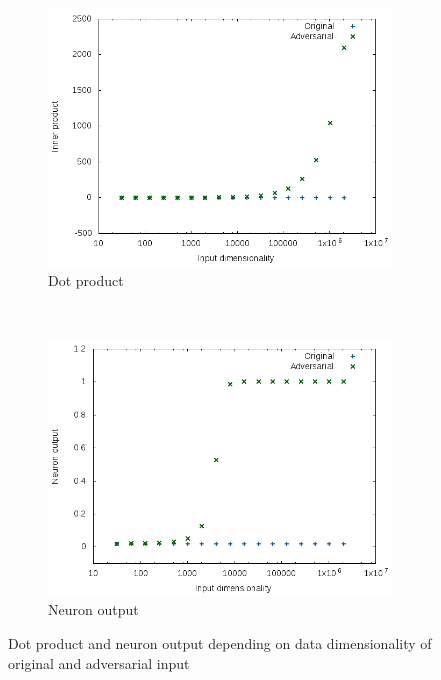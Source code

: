 \documentclass[11pt, a4paper]{article}
\begin{document}
\begin{figure}[h!tb]
    \centering
    \begin{subfigure}[t]{0.45\textwidth}
        \includegraphics[width=\textwidth]{ae_explanation_ip.png}
        \caption{Dot product}
        \label{fig:ae-explanation-inner-product}
    \end{subfigure}
    ~ %
    \begin{subfigure}[t]{0.45\textwidth}
        \includegraphics[width=\textwidth]{ae_explanation_output.png}
        \caption{Neuron output}
        \label{fig:ae-explanation-neuron-output}
    \end{subfigure}
    \caption{Dot product and neuron output depending on data dimensionality of original and adversarial input}
    \label{fig:ae-explanation}
\end{figure}
\end{document}
